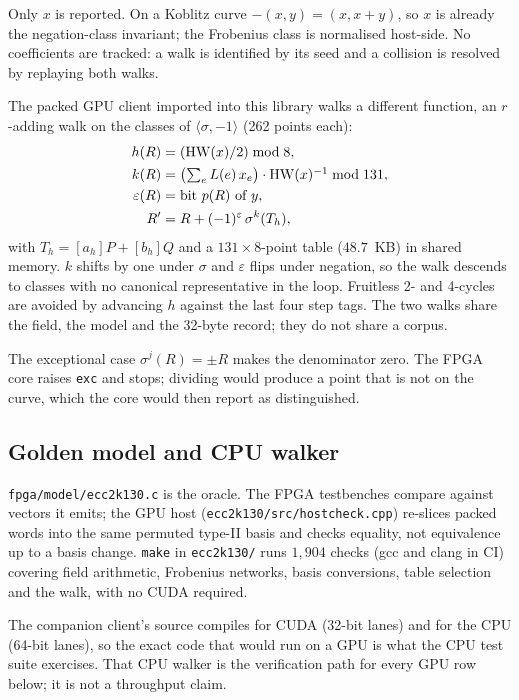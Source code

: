 Only $x$ is reported. On a Koblitz curve $-(x,y)=(x,x+y)$, so $x$ is
already the negation-class invariant; the Frobenius class is
normalised host-side. No coefficients are tracked: a walk is identified
by its seed and a collision is resolved by replaying both walks.

The packed GPU client imported into this library walks a different
function, an $r$-adding walk on the classes of $\langle\sigma,-1\rangle$
(262 points each):
\begin{align*}
  h(R) &= (\operatorname{HW}(x)/2)\bmod 8,\\
  k(R) &= \bigl(\textstyle\sum_e L(e)\,x_e\bigr)\cdot\operatorname{HW}(x)^{-1}\bmod 131,\\
  \varepsilon(R) &= \text{bit $p(R)$ of $y$},\\
  R' &= R + (-1)^{\varepsilon}\,\sigma^{k}(T_{h}),
\end{align*}
with $T_h=[a_h]P+[b_h]Q$ and a $131\times 8$-point table ($48.7$~KB)
in shared memory. $k$ shifts by one under $\sigma$ and $\varepsilon$
flips under negation, so the walk descends to classes with no
canonical representative in the loop. Fruitless 2- and 4-cycles are
avoided by advancing $h$ against the last four step tags. The two
walks share the field, the model and the 32-byte record; they do not
share a corpus.

The exceptional case $\sigma^j(R)=\pm R$ makes the denominator zero.
The FPGA core raises \texttt{exc} and stops; dividing would produce a
point that is not on the curve, which the core would then report as
distinguished.

\subsection{Golden model and CPU walker}

\texttt{fpga/model/ecc2k130.c} is the oracle. The FPGA testbenches
compare against vectors it emits; the GPU host
(\texttt{ecc2k130/src/hostcheck.cpp}) re-slices packed words into the
same permuted type-II basis and checks equality, not equivalence up
to a basis change. \texttt{make} in \texttt{ecc2k130/} runs $1{,}904$
checks (gcc and clang in CI) covering field arithmetic, Frobenius
networks, basis conversions, table selection and the walk, with no
CUDA required.

The companion client's source compiles for CUDA (32-bit lanes) and
for the CPU (64-bit lanes), so the exact code that would run on a GPU
is what the CPU test suite exercises. That CPU walker is the
verification path for every GPU row below; it is not a throughput
claim.

